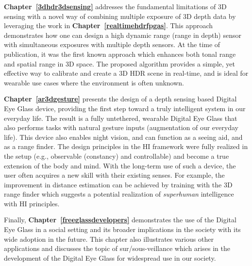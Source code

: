 \textbf{Chapter~\ref{3dhdr3dsensing}} addresses the fundamental limitations of 3D sensing with a 
novel way of combining multiple exposure of 3D depth data by leveraging the work in 
\textbf{Chapter~\ref{realtimehdrfpgas}}. This approach demonstrates how one can design a high 
dynamic range (range in depth) sensor with simultaneous exposures with multiple depth sensors. At 
the time of publication, it was the first known approach which enhances both tonal range and spatial 
range in 3D space. The proposed algorithm provides a simple, yet effective way to calibrate and 
create a 3D HDR scene in real-time, and is ideal for wearable use cases where the environment is 
often unknown.
 
\textbf{Chapter~\ref{ar3dgesture}} presents the design of a depth sensing based Digital Eye Glass 
device, providing the first step toward a truly intelligent system in our everyday life. The result is a fully 
untethered, wearable Digital Eye Glass that also performs tasks with natural gesture inputs 
(augmentation of our everyday life). This device also enables night vision, and can function as a 
seeing aid, and as a range finder. The design principles in the HI framework were fully realized in the 
setup (e.g., observable (constancy) and controllable) and become a true extension of the body and 
mind. With the long-term use of such a device, the user often acquires a new skill with their existing 
senses. For example, the improvement in distance estimation can be achieved by training with the 3D 
range finder which suggests a potential realization of \textit{superhuman} intelligence with HI 
principles.

Finally, \textbf{Chapter~\ref{freeglassdevelopers}} demonstrates the use of the Digital Eye Glass in a 
social setting and its broader implications in the society with its wide adoption in the future. This 
chapter also illustrates various other applications and discusses the topic of sur/sous-veillance which 
arises in the development of the Digital Eye Glass for widespread use in our society.



